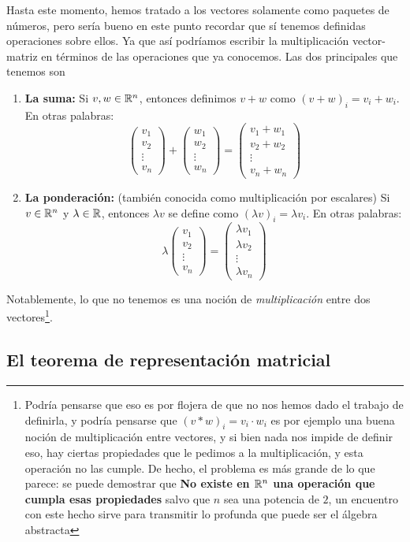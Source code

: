 Hasta este momento, hemos tratado a los vectores solamente como paquetes de números, pero sería bueno en este punto recordar que sí tenemos definidas operaciones sobre ellos. Ya que así podríamos escribir la multiplicación vector-matriz en términos de las operaciones que ya conocemos. Las dos principales que tenemos son
\begin{enumerate}
    \item \textbf{La suma:} Si $v, w \in \mathbb{R}^n$, entonces definimos $v + w$ como $(v + w)_i = v_i + w_i$. En otras palabras:
    \[\begin{pmatrix}
        v_1 \\ v_2 \\ \vdots \\ v_n
    \end{pmatrix} + \begin{pmatrix}
        w_1 \\ w_2 \\ \vdots \\ w_n
    \end{pmatrix} = \begin{pmatrix}
        v_1 + w_1 \\ v_2 + w_2 \\ \vdots \\ v_n + w_n
    \end{pmatrix}\]
    \item \textbf{La ponderación:} (también conocida como multiplicación por escalares) Si $v \in \mathbb{R}^n$ y $\lambda \in \mathbb{R}$, entonces $\lambda v$ se define como $(\lambda v)_i = \lambda v_i$. En otras palabras:
    \[\lambda \begin{pmatrix}
        v_1 \\ v_2 \\ \vdots \\ v_n
    \end{pmatrix} = \begin{pmatrix}
        \lambda v_1 \\ \lambda v_2 \\ \vdots \\ \lambda v_n
    \end{pmatrix}\]
\end{enumerate}

Notablemente, lo que no tenemos es una noción de \textit{multiplicación} entre dos vectores\footnote{Podría pensarse que eso es por flojera de que no nos hemos dado el trabajo de definirla, y podría pensarse que $(v * w)_i = v_i \cdot w_i$ es por ejemplo una buena noción de multiplicación entre vectores, y si bien nada nos impide de definir eso, hay ciertas propiedades que le pedimos a la multiplicación, y esta operación no las cumple. De hecho, el problema es más grande de lo que parece: se puede demostrar que \textbf{No existe en $\mathbb{R}^n$ una operación que cumpla esas propiedades} salvo que $n$ sea una potencia de $2$, un encuentro con este hecho sirve para transmitir lo profunda que puede ser el álgebra abstracta}.

\subsection{El teorema de representación matricial}

